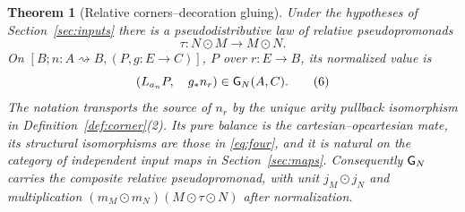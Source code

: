 \documentclass[11pt]{article}
\newtheorem{theorem}{Theorem}[section]
\theoremstyle{definition}\newtheorem{definition}[theorem]{Definition}
\begin{document}
\begin{theorem}[Relative corners--decoration gluing]\label{thm:glue}
Under the hypotheses of Section~\ref{sec:inputs} there is a
pseudodistributive law of relative pseudopromonads
\[
                   \tau:N\odot M\longrightarrow M\odot N.
\]
On $[B;n:A\rightsquigarrow B,(P,g:E\to C)]$, $P$ over $r:E\to B$,
its normalized value is
\[
             (L_{a_n}P,\quad g_* n_r)\in\mathsf G_N(A,C).
 \tag{6}\label{eq:cut}
\]
The notation transports the source of $n_r$ by the unique arity
pullback isomorphism in Definition~\ref{def:corner}(2). Its pure
balance is the cartesian--opcartesian mate, its structural isomorphisms
are those in \eqref{eq:four}, and it is natural on the category of
independent input maps in Section~\ref{sec:maps}. Consequently
$\mathsf G_N$ carries the composite relative pseudopromonad, with
unit $j_M\odot j_N$ and multiplication
$(m_M\odot m_N)(M\odot\tau\odot N)$ after normalization.
\end{theorem}
\end{document}
